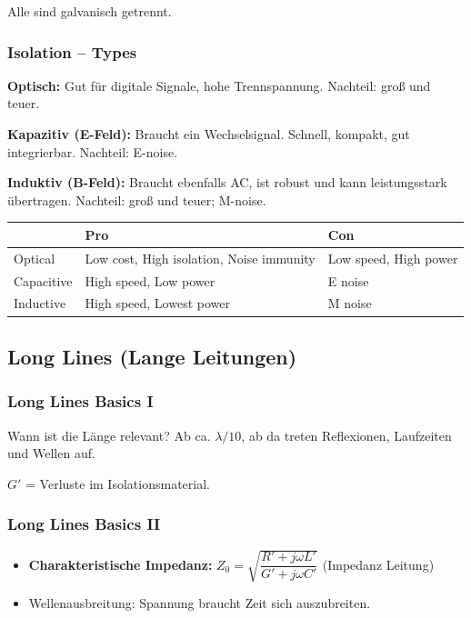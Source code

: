 \documentclass[11pt,a4paper]{article}
\begin{document}
Alle sind galvanisch getrennt.

\subsubsection{Isolation -- Types}

\textbf{Optisch:} Gut für digitale Signale, hohe Trennspannung. Nachteil: groß und teuer.

\textbf{Kapazitiv (E-Feld):} Braucht ein Wechselsignal. Schnell, kompakt, gut integrierbar. Nachteil: E-noise.

\textbf{Induktiv (B-Feld):} Braucht ebenfalls AC, ist robust und kann leistungsstark übertragen. Nachteil: groß und teuer; M-noise.

\begin{center}
\begin{tabular}{l|ll}
    \toprule
    & Pro & Con \\ \midrule
    Optical & Low cost, High isolation, Noise immunity & Low speed, High power \\
    Capacitive & High speed, Low power & E noise \\
    Inductive & High speed, Lowest power & M noise \\ \bottomrule
\end{tabular}
\end{center}

\subsection{Long Lines (Lange Leitungen)}

\subsubsection{Long Lines Basics I}
Wann ist die Länge relevant? Ab ca. $\lambda/10$, ab da treten Reflexionen, Laufzeiten und Wellen auf.

$G'$ = Verluste im Isolationsmaterial.

\subsubsection{Long Lines Basics II}
\begin{itemize}
    \item \textbf{Charakteristische Impedanz:} $Z_0 = \sqrt{\dfrac{R' + j\omega L'}{G' + j\omega C'}}$ (Impedanz Leitung)
    \item Wellenausbreitung: Spannung braucht Zeit sich auszubreiten.
\end{itemize}
\end{document}

